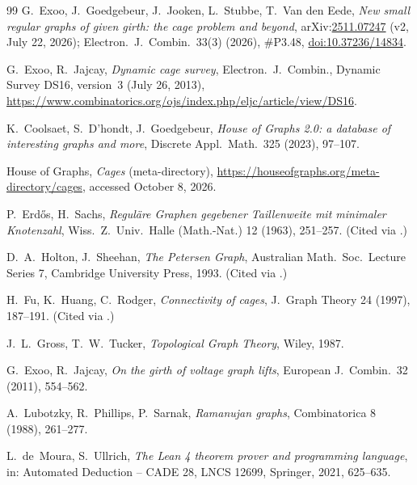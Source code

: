 \documentclass[11pt]{article}
\numberwithin{equation}{section}
\theoremstyle{definition}
\theoremstyle{remark}
\begin{document}
\begin{thebibliography}{99}
G.~Exoo, J.~Goedgebeur, J.~Jooken, L.~Stubbe, T.~Van den Eede,
\emph{New small regular graphs of given girth: the cage problem and beyond},
arXiv:\href{https://arxiv.org/abs/2511.07247}{2511.07247} (v2, July 22, 2026);
Electron.\ J.\ Combin.\ 33(3) (2026), \#P3.48, \href{https://doi.org/10.37236/14834}{doi:10.37236/14834}.

G.~Exoo, R.~Jajcay, \emph{Dynamic cage survey},
Electron.\ J.\ Combin., Dynamic Survey DS16, version~3 (July 26, 2013),
\url{https://www.combinatorics.org/ojs/index.php/eljc/article/view/DS16}.

K.~Coolsaet, S.~D'hondt, J.~Goedgebeur, \emph{House of Graphs 2.0: a database of interesting graphs
and more}, Discrete Appl.\ Math.\ 325 (2023), 97--107.

House of Graphs, \emph{Cages} (meta-directory),
\url{https://houseofgraphs.org/meta-directory/cages}, accessed October 8, 2026.

P.~Erd\H{o}s, H.~Sachs, \emph{Regul\"are Graphen gegebener Taillenweite mit minimaler
Knotenzahl}, Wiss.\ Z.\ Univ.\ Halle (Math.-Nat.) 12 (1963), 251--257. (Cited via \cite{ExJa}.)

D.~A.~Holton, J.~Sheehan, \emph{The Petersen Graph}, Australian Math.\ Soc.\ Lecture Series 7,
Cambridge University Press, 1993. (Cited via \cite{ExJa}.)

H.~Fu, K.~Huang, C.~Rodger, \emph{Connectivity of cages}, J.\ Graph Theory 24 (1997), 187--191.
(Cited via \cite{ExJa}.)

J.~L.~Gross, T.~W.~Tucker, \emph{Topological Graph Theory}, Wiley, 1987.

G.~Exoo, R.~Jajcay, \emph{On the girth of voltage graph lifts}, European J.\ Combin.\ 32 (2011),
554--562.

A.~Lubotzky, R.~Phillips, P.~Sarnak, \emph{Ramanujan graphs}, Combinatorica 8 (1988), 261--277.

L.~de~Moura, S.~Ullrich, \emph{The Lean 4 theorem prover and programming language},
in: Automated Deduction -- CADE 28, LNCS 12699, Springer, 2021, 625--635.
\end{thebibliography}
\end{document}
